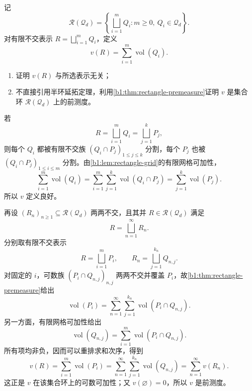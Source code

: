 \begin{exercise}\label{b1:ex:0310}
记
\[
\mathcal R(\mathscr Q_d)
=\left\{\bigsqcup_{i=1}^{m}Q_i:
m\geq0,\ Q_i\in\mathscr Q_d\right\}.
\]
对有限不交表示 \(R=\bigsqcup_{i=1}^{m}Q_i\)，定义
\[
v(R)=\sum_{i=1}^{m}\operatorname{vol}(Q_i).
\]
\begin{enumerate}
  \item 证明 \(v(R)\) 与所选表示无关；
  \item 不直接引用半环延拓定理，利用\cref{b1:thm:rectangle-premeasure}证明 \(v\) 是集合环 \(\mathcal R(\mathscr Q_d)\) 上的前测度。
\end{enumerate}
\end{exercise}
\begin{solution}
若
\[
R=\bigsqcup_{i=1}^{m}Q_i
=\bigsqcup_{j=1}^{k}P_j,
\]
则每个 \(Q_i\) 都被有限不交族
\((Q_i\cap P_j)_{1\leq j\leq k}\)
分割，每个 \(P_j\) 也被
\((Q_i\cap P_j)_{1\leq i\leq m}\)
分割。由\cref{b1:lem:rectangle-grid}的有限网格可加性，
\[
\sum_{i=1}^{m}\operatorname{vol}(Q_i)
=\sum_{i=1}^{m}\sum_{j=1}^{k}
\operatorname{vol}(Q_i\cap P_j)
=\sum_{j=1}^{k}\operatorname{vol}(P_j).
\]
所以 \(v\) 定义良好。

再设 \((R_n)_{n\geq1}\subseteq\mathcal R(\mathscr Q_d)\) 两两不交，且其并 \(R\in\mathcal R(\mathscr Q_d)\) 满足
\[
R=\bigsqcup_{n=1}^{\infty}R_n.
\]
分别取有限不交表示
\[
R=\bigsqcup_{i=1}^{m}P_i,
\qquad
R_n=\bigsqcup_{j=1}^{k_n}Q_{n,j}.
\]
对固定的 \(i\)，可数族
\((P_i\cap Q_{n,j})_{n,j}\)
两两不交并覆盖 \(P_i\)，故\cref{b1:thm:rectangle-premeasure}给出
\[
\operatorname{vol}(P_i)
=\sum_{n=1}^{\infty}\sum_{j=1}^{k_n}
\operatorname{vol}(P_i\cap Q_{n,j}).
\]
另一方面，有限网格可加性给出
\[
\operatorname{vol}(Q_{n,j})
=\sum_{i=1}^{m}\operatorname{vol}(P_i\cap Q_{n,j}).
\]
所有项均非负，因而可以重排求和次序，得到
\[
v(R)
=\sum_{i=1}^{m}\operatorname{vol}(P_i)
=\sum_{n=1}^{\infty}\sum_{j=1}^{k_n}
\operatorname{vol}(Q_{n,j})
=\sum_{n=1}^{\infty}v(R_n).
\]
这正是 \(v\) 在该集合环上的可数可加性；又 \(v(\varnothing)=0\)，所以 \(v\) 是前测度。
\end{solution}
